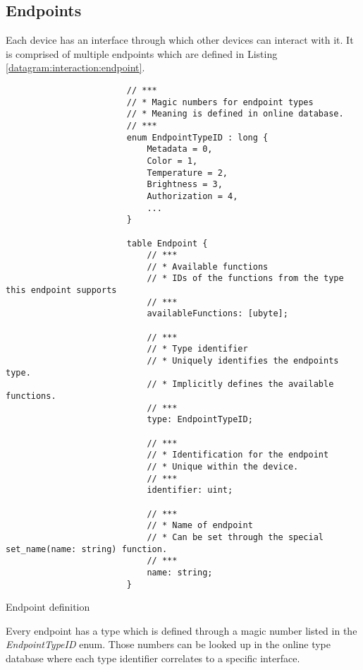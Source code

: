 \documentclass[a4paper]{report}
\begin{document}
            \subsection{Endpoints}\label{section:interaction:device:endpoints}
                Each \gls{device} has an interface through which other devices can interact with it. It is comprised of multiple endpoints which are defined in Listing \ref{datagram:interaction:endpoint}.
                \begin{listing}
                    \begin{verbatim}
                        // ***
                        // * Magic numbers for endpoint types
                        // * Meaning is defined in online database.
                        // ***
                        enum EndpointTypeID : long {
                            Metadata = 0,
                            Color = 1,
                            Temperature = 2,
                            Brightness = 3,
                            Authorization = 4,
                            ...
                        }
                        
                        table Endpoint {
                            // ***
                            // * Available functions
                            // * IDs of the functions from the type this endpoint supports
                            // ***
                            availableFunctions: [ubyte];
                            
                            // ***
                            // * Type identifier
                            // * Uniquely identifies the endpoints type.
                            // * Implicitly defines the available functions.
                            // ***
                            type: EndpointTypeID;
                            
                            // ***
                            // * Identification for the endpoint
                            // * Unique within the device.
                            // ***
                            identifier: uint;
                            
                            // ***
                            // * Name of endpoint
                            // * Can be set through the special set_name(name: string) function.
                            // ***
                            name: string;
                        }
                    \end{verbatim}
                    \caption{Endpoint definition}
                    \label{datagram:interaction:endpoint}
                \end{listing}
                Every endpoint has a type which is defined through a magic number listed in the \emph{EndpointTypeID} enum. Those numbers can be looked up in the online type database where each type identifier correlates to a specific interface.
                \clearpage
            
\end{document}
